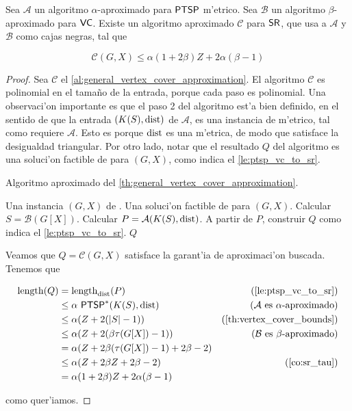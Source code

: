 \begin{theorem}
\label{th:general_vertex_cover_approximation}
Sea $\mathcal{A}$ un algoritmo $\alpha$-aproximado para $\textnormal{\textsf{PTSP}}$ m'etrico. Sea $\mathcal{B}$ un algoritmo $\beta$-aproximado para $\textnormal{\textsf{VC}}$. Existe un algoritmo aproximado $\mathcal{C}$ para $\textnormal{\textsf{SR}}$, que usa a $\mathcal{A}$ y $\mathcal{B}$ como cajas negras, tal que

\[\mathcal{C}(G, X) \leq \alpha(1 + 2\beta)Z + 2\alpha(\beta - 1)\]

\begin{proof}

Sea $\mathcal{C}$ el \autoref{al:general_vertex_cover_approximation}. El algoritmo $\mathcal{C}$ es polinomial en el tama\~no de la entrada, porque cada paso es polinomial. Una observaci'on importante es que el paso 2 del algoritmo est'a bien definido, en el sentido de que la entrada $(K(S), \textnormal{dist})$ de $\mathcal{A}$, es una instancia de  m'etrico, tal como requiere $\mathcal{A}$. Esto es porque $\textnormal{dist}$ es una m'etrica, de modo que satisface la desigualdad triangular. Por otro lado, notar que el resultado $Q$ del algoritmo es una soluci'on factible de  para $(G, X)$, como indica el \autoref{le:ptsp_vc_to_sr}.

\begin{algorithm}
  \caption{Algoritmo aproximado del \autoref{th:general_vertex_cover_approximation}.}
  \label{al:general_vertex_cover_approximation}
  \begin{algorithmic}[1]
  	\Require Una instancia $(G, X)$ de .
  	\Ensure Una soluci'on factible de  para $(G, X)$.
  	\State Calcular $S = \mathcal{B}(G[X])$.
	\State Calcular $P = \mathcal{A}(K(S), \textnormal{dist})$.
	\State A partir de $P$, construir $Q$ como indica el \autoref{le:ptsp_vc_to_sr}.
	\Return $Q$
  \end{algorithmic}
\end{algorithm}

Veamos que $Q = \mathcal{C}(G, X)$ satisface la garant'ia de aproximaci'on buscada. Tenemos que

\begin{align*}
\length(Q) &= \length_{\dist}(P) & \text{(\autoref{le:ptsp_vc_to_sr})}\\
&\leq \alpha \text{ } \problem{PTSP}^*(K(S), \dist) & \text{(} \mathcal{A} \text{ es } \alpha \text{-aproximado)}\\
&\leq \alpha (Z + 2(|S| - 1)) & \text{(\autoref{th:vertex_cover_bounds})}\\
&\leq \alpha (Z + 2(\beta \tau(G[X]) - 1)) & \text{(} \mathcal{B} \text{ es } \beta \text{-aproximado)}\\
&= \alpha (Z + 2\beta(\tau(G[X]) - 1) + 2\beta - 2) & \\
&\leq \alpha (Z + 2\beta Z + 2\beta - 2) & \text{(\autoref{co:sr_tau})}\\
&= \alpha (1 + 2\beta) Z + 2\alpha(\beta - 1) &
\end{align*}

\noindent
como quer'iamos.

\end{proof}
\end{theorem}

